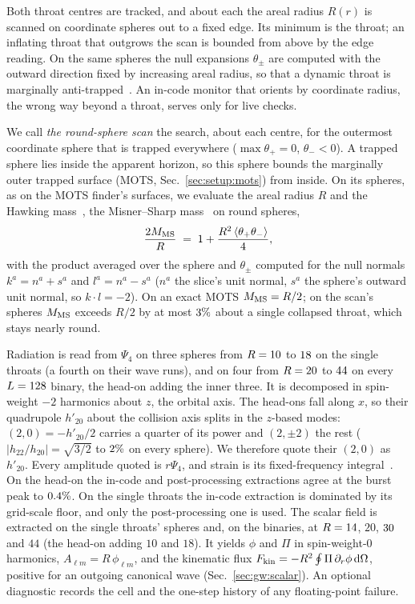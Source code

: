 \documentclass[twocolumn,floatfix,aps,prd,superscriptaddress,nofootinbib,showkeys]{revtex4-2}
\begin{document}
Both throat centres are tracked, and about each the areal radius $R(r)$ is scanned on coordinate spheres out to a fixed edge. Its minimum is the throat; an inflating throat that outgrows the scan is bounded from above by the edge reading. On the same spheres the null expansions $\theta_\pm$ are computed with the outward direction fixed by increasing areal radius, so that a dynamic throat is marginally anti-trapped~\cite{hochberg_visser1998,hayward1999}. An in-code monitor that orients by coordinate radius, the wrong way beyond a throat, serves only for live checks.

We call \emph{the round-sphere scan} the search, about each centre, for the outermost coordinate sphere that is trapped everywhere ($\max\theta_+=0$, $\theta_-<0$). A trapped sphere lies inside the apparent horizon, so this sphere bounds the marginally outer trapped surface (MOTS, Sec.~\ref{sec:setup:mots}) from inside. On its spheres, as on the MOTS finder's surfaces, we evaluate the areal radius $R$ and the Hawking mass~\cite{hawking1968}, the Misner--Sharp mass~\cite{misner_sharp1964} on round spheres,
\begin{equation}
\frac{2M_{\rm MS}}{R} \;=\; 1 + \frac{R^{2}\,\langle\theta_+\theta_-\rangle}{4},
\label{eq:misner_sharp}
\end{equation}
with the product averaged over the sphere and $\theta_\pm$ computed for the null normals $k^a=n^a+s^a$ and $l^a=n^a-s^a$ ($n^a$ the slice's unit normal, $s^a$ the sphere's outward unit normal, so $k\cdot l=-2$). On an exact MOTS $M_{\rm MS}=R/2$; on the scan's spheres $M_{\rm MS}$ exceeds $R/2$ by at most $3\%$ about a single collapsed throat, which stays nearly round.

Radiation is read from $\Psi_4$ on three spheres from $R=10$ to $18$ on the single throats (a fourth on their wave runs), and on four from $R=20$ to $44$ on every $L=128$ binary, the head-on adding the inner three. It is decomposed in spin-weight $-2$ harmonics about $z$, the orbital axis. The head-ons fall along $x$, so their quadrupole $h'_{20}$ about the collision axis splits in the $z$-based modes: $(2,0)=-h'_{20}/2$ carries a quarter of its power and $(2,\pm2)$ the rest ($|h_{22}/h_{20}|=\sqrt{3/2}$ to $2\%$ on every sphere). We therefore quote their $(2,0)$ as $h'_{20}$. Every amplitude quoted is $r\Psi_4$, and strain is its fixed-frequency integral~\cite{reisswig2011}. On the head-on the in-code and post-processing extractions agree at the burst peak to $0.4\%$. On the single throats the in-code extraction is dominated by its grid-scale floor, and only the post-processing one is used. The scalar field is extracted on the single throats' spheres and, on the binaries, at $R=14$, $20$, $30$ and $44$ (the head-on adding $10$ and $18$). It yields $\phi$ and $\Pi$ in spin-weight-$0$ harmonics, $A_{\ell m}=R\,\phi_{\ell m}$, and the kinematic flux $F_{\rm kin}=-R^2\oint\Pi\,\partial_r\phi\,\mathrm{d}\Omega$, positive for an outgoing canonical wave (Sec.~\ref{sec:gw:scalar}). An optional diagnostic records the cell and the one-step history of any floating-point failure.
\end{document}
